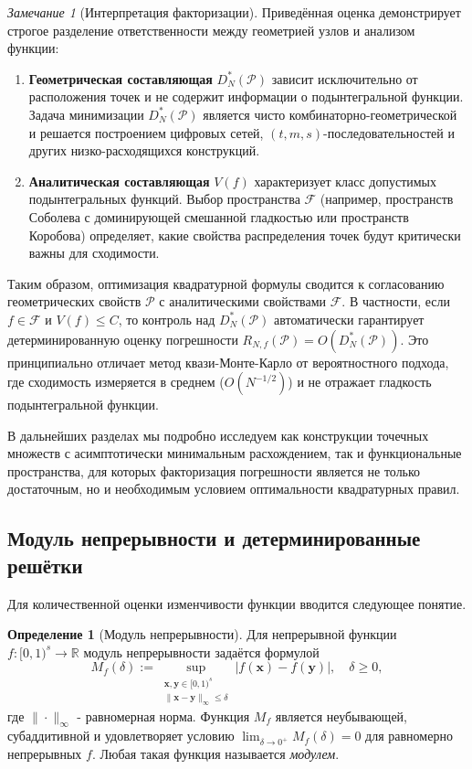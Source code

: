 \documentclass[12pt, a4paper]{article}
\theoremstyle{plain}
\theoremstyle{definition}
\newtheorem{definition}[theorem]{Определение}
\theoremstyle{remark}
\newtheorem{remark}[theorem]{Замечание}
\newcommand{\RR}{\mathbb{R}}
\newcommand{\II}{[0, 1)}
\newcommand{\PP}{\mathcal{P}}
\newcommand{\vx}{\boldsymbol{x}}
\newcommand{\vy}{\boldsymbol{y}}
\begin{document}
\begin{remark}[Интерпретация факторизации]
Приведённая оценка демонстрирует строгое разделение ответственности между геометрией узлов и анализом функции:
\begin{enumerate}
    \item \textbf{Геометрическая составляющая} $D_N^*(\PP)$ зависит исключительно от расположения точек и не содержит информации о подынтегральной функции. Задача минимизации $D_N^*(\PP)$ является чисто комбинаторно-геометрической и решается построением цифровых сетей, $(t,m,s)$-последовательностей и других низко-расходящихся конструкций.
    \item \textbf{Аналитическая составляющая} $V(f)$ характеризует класс допустимых подынтегральных функций. Выбор пространства $\mathcal{F}$ (например, пространств Соболева с доминирующей смешанной гладкостью или пространств Коробова) определяет, какие свойства распределения точек будут критически важны для сходимости.
\end{enumerate}
Таким образом, оптимизация квадратурной формулы сводится к согласованию геометрических свойств $\PP$ с аналитическими свойствами $\mathcal{F}$. В частности, если $f \in \mathcal{F}$ и $V(f) \le C$, то контроль над $D_N^*(\PP)$ автоматически гарантирует детерминированную оценку погрешности $R_{N,f}(\PP) = O(D_N^*(\PP))$. Это принципиально отличает метод квази-Монте-Карло от вероятностного подхода, где сходимость измеряется в среднем ($O(N^{-1/2})$) и не отражает гладкость подынтегральной функции.
\end{remark}

В дальнейших разделах мы подробно исследуем как конструкции точечных множеств с асимптотически минимальным расхождением, так и функциональные пространства, для которых факторизация погрешности является не только достаточным, но и необходимым условием оптимальности квадратурных правил.

\subsection{Модуль непрерывности и детерминированные решётки}
Для количественной оценки изменчивости функции вводится следующее понятие.

\begin{definition}[Модуль непрерывности]
Для непрерывной функции $f: \II^s \to \RR$ модуль непрерывности задаётся формулой
\[
M_f(\delta) := \sup_{\substack{\vx, \vy \in \II^s \\ \|\vx - \vy\|_\infty \le \delta}} |f(\vx) - f(\vy)|, \quad \delta \ge 0,
\]
где $\|\cdot\|_\infty$ - равномерная норма. Функция $M_f$ является неубывающей, субаддитивной и удовлетворяет условию $\lim_{\delta \to 0^+} M_f(\delta) = 0$ для равномерно непрерывных $f$. Любая такая функция называется \textit{модулем}.
\end{definition}
\end{document}
